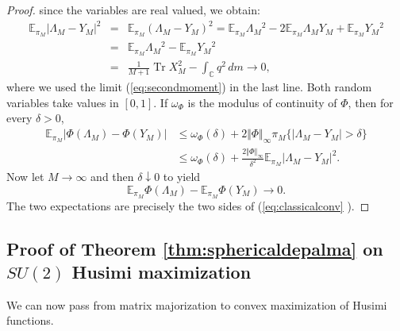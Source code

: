 \documentclass[12pt]{amsart}
\theoremstyle{plain}
\theoremstyle{definition}
\theoremstyle{remark}
\numberwithin{equation}{section}
\newcommand{\func}[1]{\operatorname{#1}}
\newcommand{\1}{\mathbf 1}
\begin{document}
\begin{proof}
since the variables are real valued, we obtain:%
\begin{eqnarray*}
\mathbb{E}_{\pi _{M}}|\Lambda _{M}-Y_{M}|^{2} &=&\mathbb{E}_{\pi _{M}}\left(
\Lambda _{M}-Y_{M}\right) ^{2}=\mathbb{E}_{\pi _{M}}\Lambda _{M}{}^{2}-2%
\mathbb{E}_{\pi _{M}}\Lambda _{M}Y_{M}+\mathbb{E}_{\pi _{M}}Y_{M}{}^{2} \\
&=&\mathbb{E}_{\pi _{M}}\Lambda _{M}{}^{2}-\mathbb{E}_{\pi _{M}}Y_{M}{}^{2}
\\
&=&\frac{1}{M+1}\func{Tr}X_{M}^{2}-\int_{\mathbb{C}}q^{2}\,dm\longrightarrow
0\text{,}
\end{eqnarray*}%
where we used the limit (\ref{eq:secondmoment}) in the last line. Both
random variables take values in $[0,1]$. If $\omega _{\Phi }$ is the modulus
of continuity of $\Phi $, then for every $\delta >0$, 
\begin{align*}
\mathbb{E}_{\pi _{M}}|\Phi (\Lambda _{M})-\Phi (Y_{M})|& \leq \omega _{\Phi
}(\delta )+2\Vert \Phi \Vert _{\infty }\pi _{M}\{|\Lambda _{M}-Y_{M}|>\delta
\} \\
& \leq \omega _{\Phi }(\delta )+\frac{2\Vert \Phi \Vert _{\infty }}{\delta
^{2}}\mathbb{E}_{\pi _{M}}|\Lambda _{M}-Y_{M}|^{2}.
\end{align*}%
Now let $M\rightarrow \infty $ and then $\delta \downarrow 0$ to yield 
\begin{equation*}
\mathbb{E}_{\pi _{M}}\Phi (\Lambda _{M})-\mathbb{E}_{\pi _{M}}\Phi
(Y_{M})\longrightarrow 0.
\end{equation*}%
The two expectations are precisely the two sides of (\ref{eq:classicalconv}%
). 
\end{proof}

\subsection{Proof of Theorem \protect\ref{thm:sphericaldepalma} on $SU(2)$
Husimi maximization}

We can now pass from matrix majorization to convex maximization of Husimi
functions.
\end{document}
